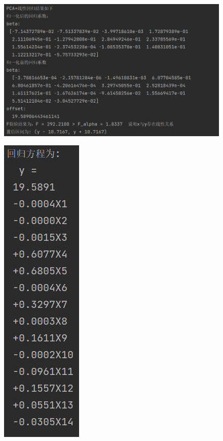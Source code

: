 \documentclass[UTF8]{ctexart}
\begin{document}
\noindent \textbf{}

\begin{figure}[H]
  \centering
  \includegraphics[scale=0.3]{PCA结果.jpg}
\end{figure}

\begin{figure}[H]
  \centering
  \includegraphics[scale=0.3]{PCA回归方程.jpg}
\end{figure}
\end{document}
